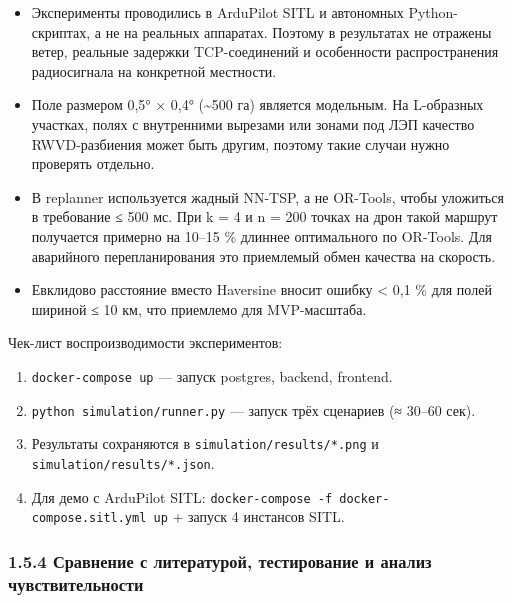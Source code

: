 \documentclass[14pt,a4paper]{extarticle}
\providecommand{\tightlist}{%
  \setlength{\itemsep}{0pt}\setlength{\parskip}{0pt}}
\begin{document}
\begin{itemize}
\tightlist
\item
  Эксперименты проводились в ArduPilot SITL и автономных Python-скриптах, а не на реальных аппаратах. Поэтому в результатах не отражены ветер, реальные задержки TCP-соединений и особенности распространения радиосигнала на конкретной местности.
\item
  Поле размером 0,5° × 0,4° (\textasciitilde500 га) является модельным. На L-образных участках, полях с внутренними вырезами или зонами под ЛЭП качество RWVD-разбиения может быть другим, поэтому такие случаи нужно проверять отдельно.
\item
  В replanner используется жадный NN-TSP, а не OR-Tools, чтобы уложиться в требование ≤ 500 мс. При k = 4 и n = 200 точках на дрон такой маршрут получается примерно на 10--15 \% длиннее оптимального по OR-Tools. Для аварийного перепланирования это приемлемый обмен качества на скорость.
\item
  Евклидово расстояние вместо Haversine вносит ошибку \textless{} 0,1 \% для полей шириной ≤ 10 км, что приемлемо для MVP-масштаба.
\end{itemize}

Чек-лист воспроизводимости экспериментов:

\begin{enumerate}
\def\labelenumi{\arabic{enumi}.}
\tightlist
\item
  \texttt{docker-compose\ up} --- запуск postgres, backend, frontend.
\item
  \texttt{python\ simulation/runner.py} --- запуск трёх сценариев (≈ 30--60 сек).
\item
  Результаты сохраняются в \texttt{simulation/results/*.png} и \texttt{simulation/results/*.json}.
\item
  Для демо с ArduPilot SITL: \texttt{docker-compose\ -f\ docker-compose.sitl.yml\ up} + запуск 4 инстансов SITL.
\end{enumerate}

\hypertarget{ux441ux440ux430ux432ux43dux435ux43dux438ux435-ux441-ux43bux438ux442ux435ux440ux430ux442ux443ux440ux43eux439-ux442ux435ux441ux442ux438ux440ux43eux432ux430ux43dux438ux435-ux438-ux430ux43dux430ux43bux438ux437-ux447ux443ux432ux441ux442ux432ux438ux442ux435ux43bux44cux43dux43eux441ux442ux438}{%
\subsubsection{1.5.4 Сравнение с литературой, тестирование и анализ чувствительности}\label{ux441ux440ux430ux432ux43dux435ux43dux438ux435-ux441-ux43bux438ux442ux435ux440ux430ux442ux443ux440ux43eux439-ux442ux435ux441ux442ux438ux440ux43eux432ux430ux43dux438ux435-ux438-ux430ux43dux430ux43bux438ux437-ux447ux443ux432ux441ux442ux432ux438ux442ux435ux43bux44cux43dux43eux441ux442ux438}}
\end{document}
